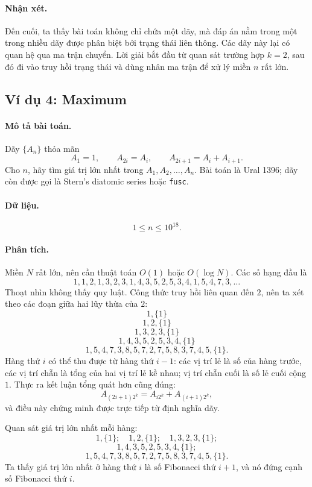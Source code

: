 \documentclass[11pt]{article}
\begin{document}
\paragraph{Nhận xét.}
Đến cuối, ta thấy bài toán không chỉ chứa một dãy, mà đáp án nằm trong một
trong nhiều dãy được phân biệt bởi trạng thái liên thông. Các dãy này lại có
quan hệ qua ma trận chuyển. Lời giải bắt đầu từ quan sát trường hợp $k=2$, sau
đó đi vào truy hồi trạng thái và dùng nhân ma trận để xử lý miền $n$ rất lớn.

\subsection{Ví dụ 4: Maximum}

\paragraph{Mô tả bài toán.}
Dãy $\{A_n\}$ thỏa mãn
\[
  A_1=1,\qquad A_{2i}=A_i,\qquad A_{2i+1}=A_i+A_{i+1}.
\]
Cho $n$, hãy tìm giá trị lớn nhất trong $A_1,A_2,\ldots,A_n$. Bài toán là Ural
1396; dãy còn được gọi là Stern's diatomic series hoặc \texttt{fusc}.

\paragraph{Dữ liệu.}
\[
  1\le n\le 10^{18}.
\]

\paragraph{Phân tích.}
Miền $N$ rất lớn, nên cần thuật toán $O(1)$ hoặc $O(\log N)$. Các số hạng đầu
là
\[
  1,1,2,1,3,2,3,1,4,3,5,2,5,3,4,1,5,4,7,3,\ldots
\]
Thoạt nhìn không thấy quy luật. Công thức truy hồi liên quan đến $2$, nên ta
xét theo các đoạn giữa hai lũy thừa của $2$:
\[
  1,\{1\}
\]
\[
  1,2,\{1\}
\]
\[
  1,3,2,3,\{1\}
\]
\[
  1,4,3,5,2,5,3,4,\{1\}
\]
\[
  1,5,4,7,3,8,5,7,2,7,5,8,3,7,4,5,\{1\}.
\]
Hàng thứ $i$ có thể thu được từ hàng thứ $i-1$: các vị trí lẻ là số của hàng
trước, các vị trí chẵn là tổng của hai vị trí lẻ kề nhau; vị trí chẵn cuối là
số lẻ cuối cộng $1$. Thực ra kết luận tổng quát hơn cũng đúng:
\[
  A_{(2i+1)2^k}=A_{i2^k}+A_{(i+1)2^k},
\]
và điều này chứng minh được trực tiếp từ định nghĩa dãy.

Quan sát giá trị lớn nhất mỗi hàng:
\[
  1,\{1\};
\quad
  1,2,\{1\};
\quad
  1,3,2,3,\{1\};
\]
\[
  1,4,3,5,2,5,3,4,\{1\};
\]
\[
  1,5,4,7,3,8,5,7,2,7,5,8,3,7,4,5,\{1\}.
\]
Ta thấy giá trị lớn nhất ở hàng thứ $i$ là số Fibonacci thứ $i+1$, và nó đứng
cạnh số Fibonacci thứ $i$.
\end{document}
